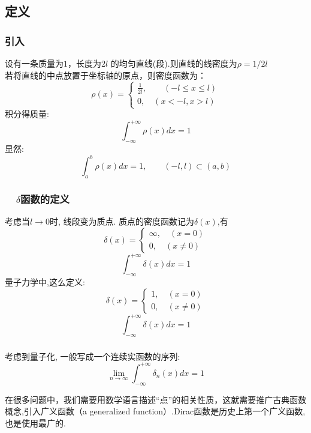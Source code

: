 \subsection{定义}
\begin{frame}
	  \frametitle{引入}
	  {\Bullet}设有一条质量为$1$，长度为$2l$ 的均匀直线(段).则直线的线密度为$\rho=1/2l$\\
	  若将直线的中点放置于坐标轴的原点，则密度函数为： 
	  \[\rho(x)=\left\{\begin{array}{c}
		\frac{1}{2 l}, \qquad (-l \leq x \leq l) \\
		0, \quad (x<-l, x>l)
		\end{array}\right.\]
	 积分得质量:
	 \[\int_{-\infty}^{+\infty} \rho(x) d x= 1\]
	 显然:
	 \[\int_{a}^{b} \rho(x) d x =1, \qquad (-l,l) \subset (a,b) \]
\end{frame}

\begin{frame}
	  \frametitle{~~$\delta$函数的定义}	 
	{\Bullet} 考虑当$l \to 0$时, 线段变为质点. 质点的密度函数记为$\delta(x)$,有
	\[\delta(x)=\left\{\begin{array}{c}
		\infty, \quad(x=0) \\
		0, \quad(x \neq 0)
		\end{array}\right. \]
	\[\int_{-\infty}^{+\infty} \delta(x) d x=1 \]
	量子力学中,这么定义:
	\[\delta(x)=\left\{\begin{array}{c}
		1, \quad(x=0) \\
		0, \quad(x \neq 0)
		\end{array}\right. \]
	\[\int_{-\infty}^{+\infty} \delta(x) d x=1 \]
\end{frame}

\begin{frame}
	  \frametitle{}
	  考虑到量子化, 一般写成一个连续实函数的序列: 
	  \[\lim_{n\to\infty} \int_{-\infty}^{+\infty} \delta_n (x) d x=1 \]

	  {\Tips} 在很多问题中，我们需要用数学语言描述“点”的相关性质，这就需要推广古典函数概念,引入广义函数（a generalized function）.Dirac函数是历史上第一个广义函数,也是使用最广的.
\end{frame}

